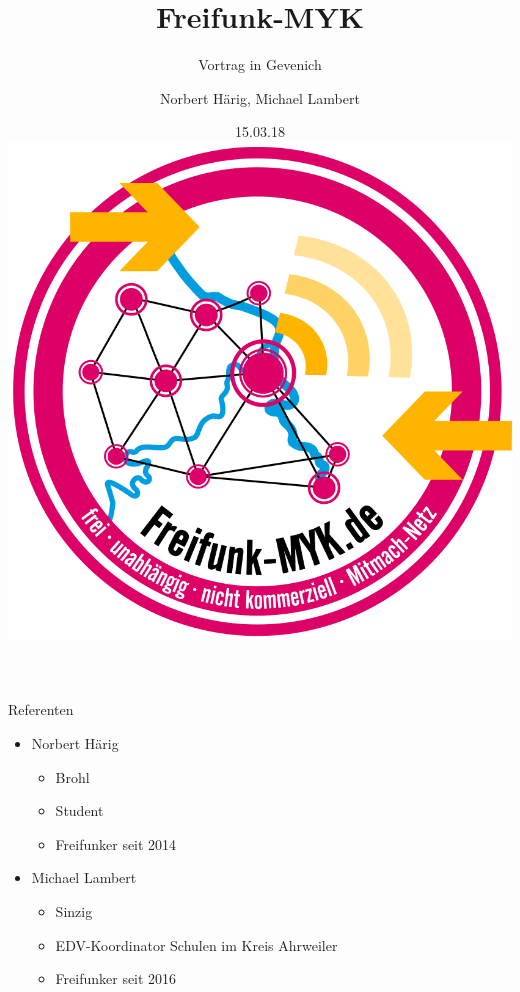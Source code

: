 \documentclass{beamer}
\begin{document}
\title[]{Freifunk-MYK}
\subtitle[Freifunk-MYK]{Vortrag in Gevenich}
\author[Freifunk-MYK]{Norbert Härig, Michael Lambert}
\date{15.03.18\\\vspace{0.5cm} \includegraphics[scale=0.1]{Bilder/Logo.png}}
\institute{}

\begin{frame}
\titlepage	
\end{frame}
\begin{frame}{Referenten}
\begin{itemize}
	\item Norbert Härig
	\begin{itemize}
		\item Brohl
		\item Student
		\item Freifunker seit 2014
	\end{itemize}
	\item Michael Lambert
	\begin{itemize}
		\item Sinzig
		\item EDV-Koordinator Schulen im Kreis Ahrweiler
		\item Freifunker seit 2016
	\end{itemize}
\end{itemize}
\end{frame}
\end{document}
